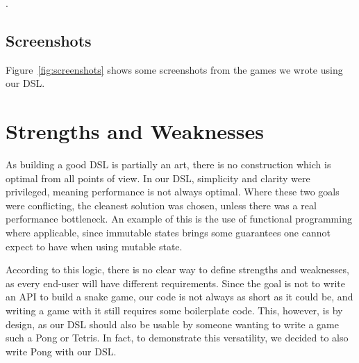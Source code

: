 \documentclass[journal,onecolumn]{IEEEtran}
\theoremstyle{definition}
\begin{document}
\subsubsection{}%
.

\subsection{Screenshots}
Figure~\ref{fig:screenshots} shows some screenshots from the games we wrote using our DSL. %


\section{Strengths and Weaknesses}
\label{sec:evaluation}
As building a good DSL is partially an art, there is no construction which is optimal from all points of view.
In our DSL, simplicity and clarity were privileged, meaning performance is not always optimal.
Where these two goals were conflicting, the cleanest solution was chosen, unless there was a real performance bottleneck.
An example of this is the use of functional programming where applicable, since immutable states brings some guarantees one cannot expect to have when using mutable state.

According to this logic, there is no clear way to define strengths and weaknesses, as every end-user will have different requirements.
Since the goal is not to write an API to build a snake game, our code is not always as short as it could be, and writing a game with it still requires some boilerplate code.
This, however, is by design, as our DSL should also be usable by someone wanting to write a game such a Pong or Tetris.
In fact, to demonstrate this versatility, we decided to also write Pong with our DSL.
\end{document}
